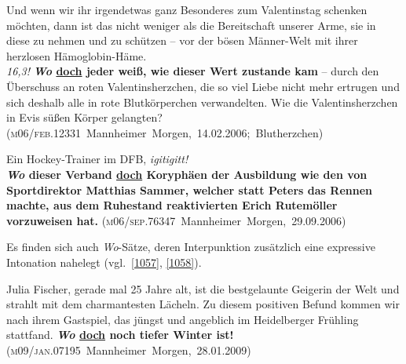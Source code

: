\begin{exe}
	\ex\label{1055} 

	Und wenn wir ihr irgendetwas ganz Besonderes zum Valentinstag schenken möchten, dann ist das nicht weniger als die Bereitschaft unserer Arme, sie in 		diese zu nehmen und zu schützen – vor der bösen Männer-Welt mit ihrer herzlosen Hämoglobin-Häme.\\
	\emph{16,3!} \textbf{\textit{Wo} \ul{doch} jeder weiß, wie dieser Wert zustande kam} – durch den Überschuss an roten Valentinsherzchen, die so 		viel Liebe nicht mehr ertrugen und sich deshalb alle in rote Blutkörperchen verwandelten. Wie die Valentinsherzchen in Evis süßen Körper gelangten? 
	\newline              		
	\hbox{}\hfill\hbox{(\textsc{m06/feb.12331} Mannheimer Morgen, 14.02.2006; Blutherzchen)}
\end{exe}

\begin{exe}
	\ex\label{1056} 

	Ein Hockey-Trainer im DFB, \emph{igitigitt!}\\
	\textbf{\textit{Wo} dieser Verband \ul{doch} Koryphäen der Ausbildung wie den von Sportdirektor Matthias Sammer, welcher statt Peters das Rennen 	machte, aus dem Ruhestand reaktivierten Erich Rutemöller vorzuweisen hat.}   
	\newline\hbox{}\hfill\hbox{(\textsc{m06/sep.76347} Mannheimer Morgen, 29.09.2006)}
\end{exe}
Es finden sich auch \textit{Wo}-Sätze, deren Interpunktion zusätzlich eine expressive Intonation nahelegt (vgl.\ \ref{1057}, \ref{1058}).

\begin{exe}
	\ex\label{1057} 

	Julia Fischer, gerade mal 25 Jahre alt, ist die bestgelaunte Geigerin der Welt und strahlt mit dem charmantesten Lächeln. Zu diesem positiven Befund 		kommen wir nach ihrem Gastspiel, das jüngst und angeblich im Heidelberger Frühling stattfand. \textbf{\textit{Wo} \ul{doch} noch tiefer Winter 		ist!} 	  
	\newline              		
	\hbox{}\hfill\hbox{(\textsc{m09/jan.07195} Mannheimer Morgen, 28.01.2009)}
\end{exe}

